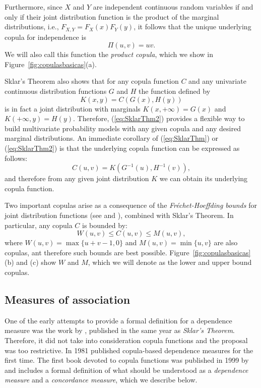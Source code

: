 \documentclass[journal]{vgtc}                %
\begin{document}
Furthermore, since $X$ and $Y$ are independent continuous random variables if and only if their joint distribution function is the product of the marginal distributions, i.e., $F_{X,Y}=F_X(x)F_Y(y)$, it follows that the unique underlying copula for independence is
\begin{equation}\label{eq:copulaPi}
    \Pi(u,v)=uv.
\end{equation}
We will also call this function the \textit{product copula}, which we show in Figure~\ref{fig:copulasbasicas}(a).

Sklar's Theorem also shows that for any copula function $C$ and any univariate continuous distribution functions $G$ and $H$ the function defined by
\begin{equation}\label{eq:SklarThm2}
    K(x,y) = C(G(x),H(y))
\end{equation}
is in fact a joint distribution with marginals $K(x,+\infty)=G(x)$ and $K(+\infty,y)=H(y).$ Therefore, (\ref{eq:SklarThm2}) provides a flexible way to build multivariate probability models with any given copula and any desired marginal distributions. An immediate corollary of (\ref{eq:SklarThm}) or (\ref{eq:SklarThm2}) is that the underlying copula function can be expressed as follows:
\begin{equation}\label{eq:SklarThm3}
    C(u,v) = K(G^{-1}(u),H^{-1}(v)),
\end{equation}
and therefore from any given joint distribution $K$ we can obtain its underlying copula function.


Two important copulas arise as a consequence of the \textit{Fréchet-Hoeffding bounds} for joint distribution functions (see \cite{Frechet1951} and \cite{Hoeffding1949}), combined with Sklar's Theorem. In particular, any copula $C$ is bounded by:
\begin{equation}\label{eq:FHbounds}
    W(u,v) \leq C(u,v) \leq M(u,v),
\end{equation}
where $W(u,v)=\max\{u+v-1,0\}$ and $M(u,v)=\min\{u,v\}$ are also copulas, ant therefore such bounds are best possible. Figure~\ref{fig:copulasbasicas}(b) and (c) show $W$ and $M$, which we will denote as the lower and upper bound copulas.




\subsection{Measures of association}
\label{sec:measuresassociation}

One of the early attempts to provide a formal definition for a dependence measure was the work by \cite{Renyi1959}, published in the same year as \textit{Sklar's Theorem}. Therefore, it did not take into consideration copula functions and the proposal was too restrictive. In 1981 \cite{Schweizer1981} published copula-based dependence measures for the first time. The first book devoted to copula functions was published in 1999 by \cite{Nelsen1999} and includes a formal definition of what should be understood as a \textit{dependence measure} and a \textit{concordance measure}, which we describe below.
\end{document}
